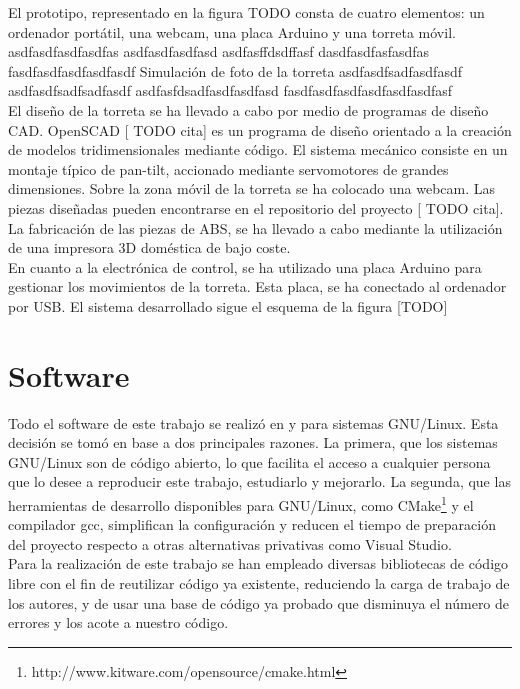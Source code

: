 El prototipo, representado en la figura TODO consta de cuatro elementos: un ordenador portátil, una webcam, una placa Arduino y una torreta móvil.\\

asdfasdfasdfasdfas
asdfasdfasdfasd
asdfasffdsdffasf
dasdfasdfasfasdfas
fasdfasdfasdfasdfasdf      Simulación de foto de la torreta
asdfasdfsadfasdfasdf
asdfasdfsadfsadfasdf
asdfasfdsadfasdfasdfasd
fasdfasdfasdfasdfasdfasdfasf\\

El diseño de la torreta se ha llevado a cabo por medio de programas de diseño CAD. OpenSCAD [ TODO cita] es un programa de diseño orientado a la creación de modelos tridimensionales mediante código. El sistema mecánico consiste en un montaje típico de pan-tilt, accionado mediante servomotores de grandes dimensiones. Sobre la zona móvil de la torreta se ha colocado una webcam. Las piezas diseñadas pueden encontrarse en el repositorio del proyecto [ TODO cita].\\

La fabricación de las piezas de ABS, se ha llevado a cabo mediante la utilización de una impresora 3D doméstica de bajo coste.\\

En cuanto a la electrónica de control, se ha utilizado una placa Arduino para gestionar los movimientos de la torreta. Esta placa, se ha conectado al ordenador por USB. El sistema desarrollado sigue el esquema de la figura [TODO]\\

\newpage

\section{Software}
Todo el software de este trabajo se realizó en y para sistemas GNU/Linux. Esta decisión se tomó en base a dos principales razones. La primera, que los sistemas GNU/Linux son de código abierto, lo que facilita el acceso a cualquier persona que lo desee a reproducir este trabajo, estudiarlo y mejorarlo. La segunda, que las herramientas de desarrollo disponibles para GNU/Linux, como CMake\footnote{http://www.kitware.com/opensource/cmake.html} y el compilador gcc, simplifican la configuración y reducen el tiempo de preparación del proyecto respecto a otras alternativas privativas como Visual Studio.\\

Para la realización de este trabajo se han empleado diversas bibliotecas de código libre con el fin de reutilizar código ya existente, reduciendo la carga de trabajo de los autores, y de usar una base de código ya probado que disminuya el número de errores y los acote a nuestro código.\\

